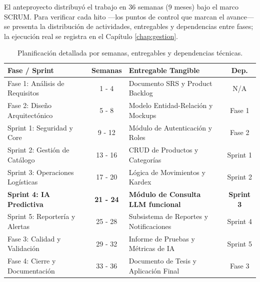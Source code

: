 


El anteproyecto distribuyó el trabajo en 36 semanas (9 meses) bajo el marco SCRUM. Para verificar cada hito ---los puntos de control que marcan el avance--- se presenta la distribución de actividades, entregables y dependencias entre fases; la ejecución real se registra en el Capítulo \ref{chap:gestion}.

\begin{table}[H]
\centering
\small
\renewcommand{\arraystretch}{1.3}
\begin{tabular}{|p{4.8cm}|c|p{4.8cm}|c|}
\hline
\rowcolor[gray]{0.9} \textbf{Fase / Sprint} & \textbf{Semanas} & \textbf{Entregable Tangible} & \textbf{Dep.} \\ \hline
Fase 1: Análisis de Requisitos & 1 - 4 & Documento SRS y Product Backlog & N/A \\ \hline
Fase 2: Diseño Arquitectónico & 5 - 8 & Modelo Entidad-Relación y Mockups & Fase 1 \\ \hline
Sprint 1: Seguridad y Core & 9 - 12 & Módulo de Autenticación y Roles & Fase 2 \\ \hline
Sprint 2: Gestión de Catálogo & 13 - 16 & CRUD de Productos y Categorías & Sprint 1 \\ \hline
Sprint 3: Operaciones Logísticas & 17 - 20 & Lógica de Movimientos y Kardex & Sprint 2 \\ \hline
\textbf{Sprint 4: IA Predictiva} & \textbf{21 - 24} & \textbf{Módulo de Consulta LLM funcional} & \textbf{Sprint 3} \\ \hline
Sprint 5: Reportería y Alertas & 25 - 28 & Subsistema de Reportes y Notificaciones & Sprint 4 \\ \hline
Fase 3: Calidad y Validación & 29 - 32 & Informe de Pruebas y Métricas de IA & Sprint 5 \\ \hline
Fase 4: Cierre y Documentación & 33 - 36 & Documento de Tesis y Aplicación Final & Fase 3 \\ \hline
\end{tabular}
\caption{Planificación detallada por semanas, entregables y dependencias técnicas.}
\label{tab:cronograma_semanal}
\end{table}

